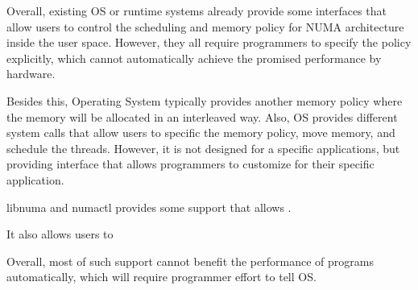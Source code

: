 Overall, existing OS or runtime systems already provide some interfaces that allow users to control the scheduling and memory policy for NUMA architecture inside the user space. However, they all require programmers to specify the policy explicitly, which cannot automatically achieve the promised performance by hardware.     





Besides this, Operating System typically provides another memory policy where the memory will be allocated in an interleaved way. Also, OS provides different system calls that allow users to specific the memory policy, move memory, and schedule the threads. However, it is not designed for a specific applications, but providing interface that allows programmers to customize for their specific application. 

libnuma and numactl provides some support that allows .

It also allows users to   


Overall, most of such support cannot benefit the performance of programs automatically, which will require programmer effort to tell OS.   

 